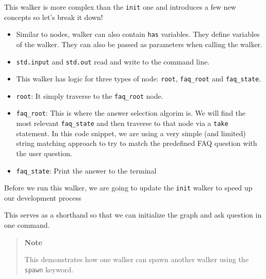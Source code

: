 This walker is more complex than the \texttt{init} one and introduces a
few new concepts so let's break it down!

\begin{itemize}
    \tightlist
    \item
          Similar to nodes, walker can also contain \texttt{has} variables. They
          define variables of the walker. They can also be passed as parameters
          when calling the walker.
    \item
          \texttt{std.input} and \texttt{std.out} read and write to the command
          line.
    \item
          This walker has logic for three types of node: \texttt{root},
          \texttt{faq\_root} and \texttt{faq\_state}.
    \item
          \texttt{root}: It simply traverse to the \texttt{faq\_root} node.
    \item
          \texttt{faq\_root}: This is where the answer selection algorim is. We
          will find the most relevant \texttt{faq\_state} and then traverse to
          that node via a \texttt{take} statement. In this code snippet, we are
          using a very simple (and limited) string matching approach to try to
          match the predefined FAQ question with the user question.
    \item
          \texttt{faq\_state}: Print the answer to the terminal
\end{itemize}

Before we run this walker, we are going to update the \texttt{init}
walker to speed up our development process

\begin{Shaded}
    \begin{Highlighting}[]
        \OperatorTok{\{}
        \OperatorTok{\{}
        \OperatorTok{-->} \OperatorTok{::}\OperatorTok{;}
        \OperatorTok{::}\OperatorTok{;}
        \OperatorTok{\}}
        \OperatorTok{\}}
    \end{Highlighting}
\end{Shaded}

This serves as a shorthand so that we can initialize the graph and ask
question in one command.

\begin{quote}
    \textbf{Note}

    This demonstrates how one walker can spawn another walker using the
    \texttt{spawn} keyword.
\end{quote}

